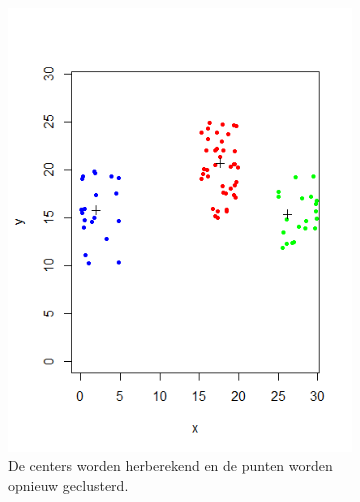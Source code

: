 \documentclass[a4paper,12pt]{article}
\theoremstyle{definition}
\begin{document}
\begin{figure}[!ht]
\begin{subfigure}[t]{0.3\textwidth}
        \includegraphics[width=\textwidth]{kmeans_it3.png}
        \caption{De centers worden herberekend en de punten worden opnieuw geclusterd.}
    \end{subfigure}
    \begin{subfigure}[t]{0.3\textwidth}

\end{subfigure}
\end{figure}
\end{document}
